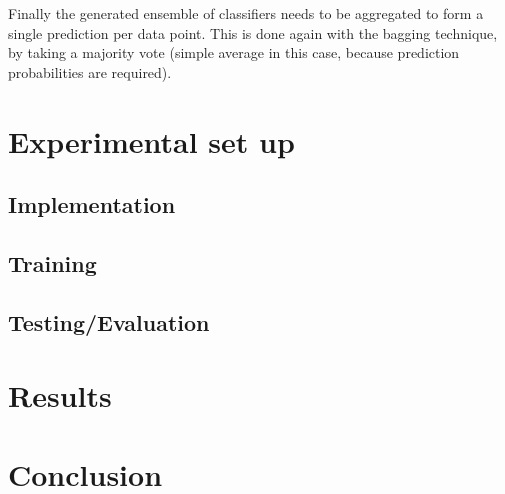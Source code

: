 \documentclass[conference]{IEEEtran}
\begin{document}
Finally the generated ensemble of classifiers needs to be aggregated to form a
single prediction per data point. This is done again with the bagging technique,
by taking a majority vote (simple average in this case, because prediction
probabilities are required).

\section{Experimental set up}
\label{sec:experiment}

\subsection{Implementation}
\label{sec:implementation}


\subsection{Training}


\subsection{Testing/Evaluation}



\section{Results}
\label{sec:results}

\section{Conclusion}
\label{sec:conclusion}

\clearpage
\appendix
\end{document}
